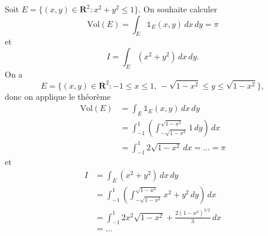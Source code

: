 \begin{example}
Soit $E=\{ (x,y)\in \mathbf{R}^{2}:x^{2}+y^{2} \le 1 \}$. On souhaite calculer 
$$
\mathrm{Vol}(E)=\int _{E}\mathbb{1}_{E}(x,y)\,dx\,dy=\pi
$$
et
$$
I=\int _{E}(x^{2}+y^{2})\,dx\,dy.
$$
On a 
$$
E=\{ (x,y)\in \mathbf{R}^{2}:-1\le x\le 1, \, -\sqrt{ 1-x^{2} }\le y \le \sqrt{ 1-x^{2} } \},
$$
donc on applique le théorème
\begin{align*}
\mathrm{Vol}(E) & =\int _{E}\mathbb{1}_{E}(x,y)\,dx\,dy \\
 & =\int_{-1}^{1} \left( \int_{-\sqrt{ 1-x^{2} }}^{\sqrt{ 1-x^{2} }} 1 \, dy  \right) \, dx \\
  & =\int_{-1}^{1} 2\sqrt{ 1-x^{2} } \, dx =\dots=\pi
\end{align*}
et
\begin{align*}
I & =\int _{E}(x^{2}+y^{2})\,dx\,dy \\
 & =\int_{-1}^{1} \left( \int_{-\sqrt{ 1-x^{2} }}^{\sqrt{ 1-x^{2} }} x^{2}+y^{2} \, dy  \right) \, dx \\
 & =\int_{-1}^{1} 2x^{2}\sqrt{ 1-x^{2} }+ \frac{2(1-x^{2})^{3/2}}{3}  \, dx \\
 & =\dots  
\end{align*}
\end{example}